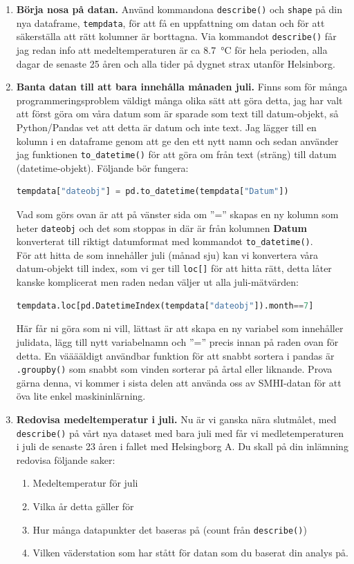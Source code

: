 \documentclass{article}
\begin{document}
\begin{enumerate}
    \item \textbf{Börja nosa på datan.} Använd kommandona \verb+describe()+ och \verb+shape+ på din nya dataframe, \verb+tempdata+, för att få en uppfattning om datan och för att säkerställa att rätt kolumner är borttagna.  Via kommandot \verb+describe()+ får jag redan info att medeltemperaturen är ca \SI{8.7}{\celsius} för hela perioden, alla dagar de senaste 25 åren och alla tider på dygnet strax utanför Helsinborg.
    \item \textbf{Banta datan till att bara innehålla månaden juli.} Finns som för många programmeringsproblem väldigt många olika sätt att göra detta, jag har valt att först göra om våra datum som är sparade som text till datum-objekt, så Python/Pandas vet att detta är datum och inte text. Jag lägger till en kolumn i en dataframe genom att ge den ett nytt namn och sedan använder jag funktionen \verb+to_datetime()+ för att göra om från text (sträng) till datum (datetime-objekt). Följande bör fungera:
    \begin{lstlisting}[language=Python]
tempdata["dateobj"] = pd.to_datetime(tempdata["Datum"])        
    \end{lstlisting}
    Vad som görs ovan är att på vänster sida om ”=” skapas en ny kolumn som heter \verb+dateobj+ och det som stoppas in där är från kolumnen \textbf{Datum} konverterat till riktigt datumformat med kommandot \verb+to_datetime()+.\\
    För att hitta de som innehåller juli (månad sju) kan vi konvertera våra datum-objekt till index, som vi ger till \verb+loc[]+ för att hitta rätt, detta låter kanske komplicerat men raden nedan väljer ut alla juli-mätvärden:
\begin{lstlisting}[language=Python]
tempdata.loc[pd.DatetimeIndex(tempdata["dateobj"]).month==7]
\end{lstlisting}        
Här får ni göra som ni vill, lättast är att skapa en ny variabel som innehåller julidata, lägg till nytt variabelnamn och ”=” precis innan på raden ovan för detta. En vääääldigt användbar funktion för att snabbt sortera i pandas är \verb+.groupby()+ som snabbt som vinden sorterar på årtal eller liknande. Prova gärna denna, vi kommer i sista delen att använda oss av SMHI-datan för att öva lite enkel maskininlärning.
\item \textbf{Redovisa medeltemperatur i juli.} Nu är vi ganska nära slutmålet, med \verb+describe()+ på vårt nya dataset med bara juli med får vi medletemperaturen i juli de senaste 23 åren i fallet med Helsingborg A. Du skall på din inlämning redovisa följande saker:
\begin{enumerate}
    \item Medeltemperatur för juli
    \item Vilka år detta gäller för
    \item Hur många datapunkter det baseras på (count från \verb+describe()+)
    \item Vilken väderstation som har stått för datan som du baserat din analys på.
\end{enumerate}


\end{enumerate}
\end{document}
